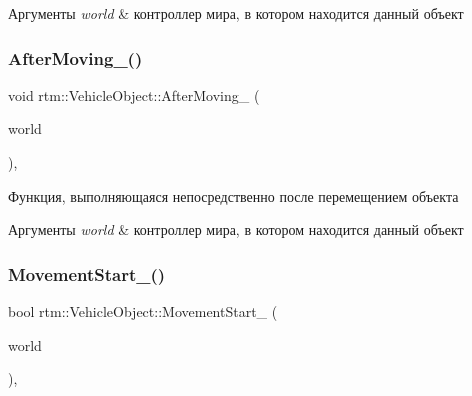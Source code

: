 \begin{DoxyParams}{Аргументы}
{\em world} & контроллер мира, в котором находится данный объект \\
\hline
\end{DoxyParams}
\mbox{\label{classrtm_1_1_vehicle_object_a4ffe184361efac31e9a009cfc4e07a1b}} 
\subsubsection{\texorpdfstring{After\+Moving\+\_\+()}{AfterMoving\_()}}
{\footnotesize\ttfamily void rtm\+::\+Vehicle\+Object\+::\+After\+Moving\+\_\+ (\begin{DoxyParamCaption}\item[{\hyperlink{classrtm_1_1_world_controller}{World\+Controller} $\ast$const}]{world }\end{DoxyParamCaption})\hspace{0.3cm}{\ttfamily [protected]}, {\ttfamily [virtual]}}



Функция, выполняющаяся непосредственно после перемещением объекта 


\begin{DoxyParams}{Аргументы}
{\em world} & контроллер мира, в котором находится данный объект \\
\hline
\end{DoxyParams}
\mbox{\label{classrtm_1_1_vehicle_object_aa02e0b8f3fa159939f370938e45abf88}} 
\subsubsection{\texorpdfstring{Movement\+Start\+\_\+()}{MovementStart\_()}}
{\footnotesize\ttfamily bool rtm\+::\+Vehicle\+Object\+::\+Movement\+Start\+\_\+ (\begin{DoxyParamCaption}\item[{\hyperlink{classrtm_1_1_world_controller}{World\+Controller} $\ast$const}]{world }\end{DoxyParamCaption})\hspace{0.3cm}{\ttfamily [protected]}, {\ttfamily [virtual]}}



